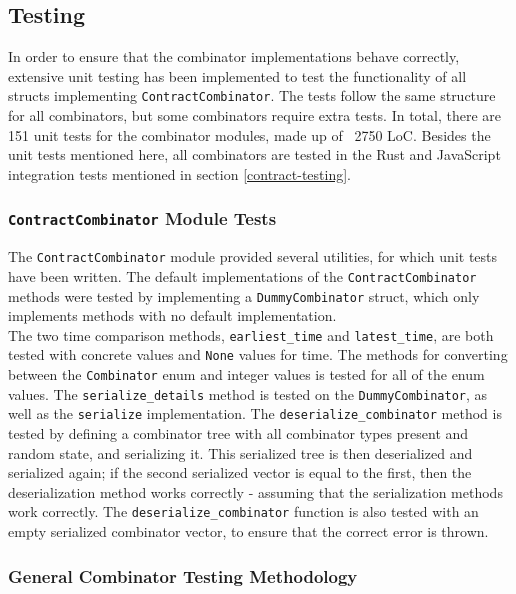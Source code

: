 \subsection{Testing}

In order to ensure that the combinator implementations behave correctly, extensive unit testing has been implemented to test the functionality of all structs implementing \texttt{ContractCombinator}. The tests follow the same structure for all combinators, but some combinators require extra tests. In total, there are 151 unit tests for the combinator modules, made up of ~2750 LoC. Besides the unit tests mentioned here, all combinators are tested in the Rust and JavaScript integration tests mentioned in section \ref{contract-testing}.


\subsubsection{\texttt{ContractCombinator} Module Tests}

The \texttt{ContractCombinator} module provided several utilities, for which unit tests have been written. The default implementations of the \texttt{ContractCombinator} methods were tested by implementing a \texttt{DummyCombinator} struct, which only implements methods with no default implementation. \\

The two time comparison methods, \texttt{earliest\_time} and \texttt{latest\_time}, are both tested with concrete values and \texttt{None} values for time. The methods for converting between the \texttt{Combinator} enum and integer values is tested for all of the enum values. The \texttt{serialize\_details} method is tested on the \texttt{DummyCombinator}, as well as the \texttt{serialize} implementation. The \texttt{deserialize\_combinator} method is tested by defining a combinator tree with all combinator types present and random state, and serializing it. This serialized tree is then deserialized and serialized again; if the second serialized vector is equal to the first, then the deserialization method works correctly - assuming that the serialization methods work correctly. The \texttt{deserialize_combinator} function is also tested with an empty serialized combinator vector, to ensure that the correct error is thrown.


\subsubsection{General Combinator Testing Methodology}

